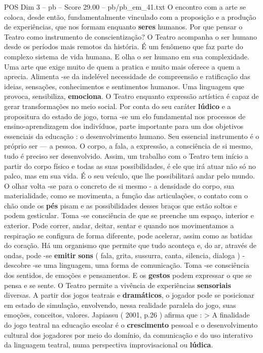 \begin{textsample}{POS Dim 3 – pb – Score 29.00 – pb/pb\_em\_41.txt}
O encontro com a arte se coloca, desde então, fundamentalmente vinculado com a proposição e a produção de experiências, que nos formam enquanto \textbf{seres} humanos.
Por que pensar o Teatro como instrumento de conscientização?
O Teatro acompanha o ser humano desde os períodos mais remotos da história.
É um fenômeno que faz parte do complexo sistema de vida humana.
E olha o ser humano em sua complexidade.
Uma arte que exige muito de quem a pratica e muito mais oferece a quem a aprecia.
Alimenta -se da indelével necessidade de compreensão e ratificação das ideias, sensações, conhecimentos e sentimentos humanos.
Uma linguagem que provoca, sensibiliza, \textbf{emociona}.
O Teatro enquanto expressão artística é capaz de gerar transformações no meio social.
Por conta do seu caráter \textbf{lúdico} e a propositura do estado de jogo, torna -se um elo fundamental nos processos de ensino-aprendizagem dos indivíduos, parte importante para um dos objetivos essenciais da educação : o desenvolvimento humano.
Seu essencial instrumento é o próprio ser — a pessoa.
O corpo, a fala, a expressão, a consciência de si mesmo, tudo é preciso ser desenvolvido.
Assim, um trabalho com o Teatro tem início a partir do corpo físico e todas as suas possibilidades, é ele que irá atuar não só no palco, mas em sua vida.
É o seu veículo, que lhe possibilitará andar pelo mundo.
O olhar volta -se para o concreto de si mesmo - a densidade do corpo, sua materialidade, como se movimenta, a função das articulações, o contato com o chão onde os \textbf{pés} pisam e as possibilidades desses braços que estão soltos e podem gesticular.
Toma -se consciência de que se preenche um espaço, interior e exterior.
Pode correr, andar, deitar, sentar e quando nos movimentamos a respiração se configura de forma diferente, pode acelerar, assim como as batidas do coração.
Há um organismo que permite que tudo aconteça e, do ar, através de ondas, pode -se \textbf{emitir} \textbf{sons} ( fala, grita, sussurra, canta, silencia, dialoga ) - descobre -se uma linguagem, uma forma de comunicação.
Toma -se consciência dos sentidos, de emoções e pensamentos.
E os \textbf{gestos} podem expressar o que se pensa e se sente.
O Teatro permite a vivência de experiências \textbf{sensoriais} diversas.
A partir dos jogos teatrais e \textbf{dramáticos}, o jogador pode se posicionar em estado de simulação, envolvendo, nessa realidade paralela do jogo, suas emoções, conceitos, valores.
Japiassu ( 2001, p.26 ) afirma que : > A finalidade do jogo teatral na educação escolar é o \textbf{crescimento} pessoal e o desenvolvimento cultural dos jogadores por meio do domínio, da comunicação e do uso interativo da linguagem teatral, numa perspectiva improvisacional ou \textbf{lúdica}.

\end{textsample}
